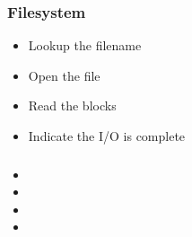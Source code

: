 \begin{frame}
  \frametitle{Filesystem}
  \begin{itemize}
  \item Lookup the filename
  \item Open the file
  \item Read the blocks 
  \item Indicate the I/O is complete
  \end{itemize}
\end{frame}

\begin{frame}
  \frametitle{}
  \begin{itemize}
  \item 
  \item 
  \item 
  \item 
  \end{itemize}
\end{frame}



